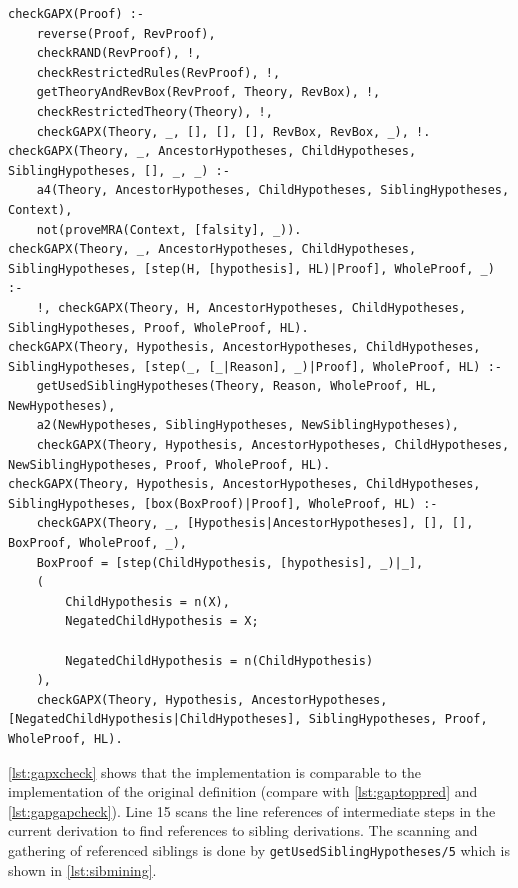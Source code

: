 \documentclass[11pt,twoside,a4paper]{report}
\begin{document}
\begin{lstlisting}[caption={Checking whether a proof is follows the extended Genuine Absurdity Property},label=lst:gapxcheck]
% Checks that the given proof follows the extended GAP property
checkGAPX(Proof) :- 
	reverse(Proof, RevProof), 
	checkRAND(RevProof), !,
	checkRestrictedRules(RevProof), !,
	getTheoryAndRevBox(RevProof, Theory, RevBox), !,
	checkRestrictedTheory(Theory), !,
	checkGAPX(Theory, _, [], [], [], RevBox, RevBox, _), !.
checkGAPX(Theory, _, AncestorHypotheses, ChildHypotheses, SiblingHypotheses, [], _, _) :-
	a4(Theory, AncestorHypotheses, ChildHypotheses, SiblingHypotheses, Context),
	not(proveMRA(Context, [falsity], _)).
checkGAPX(Theory, _, AncestorHypotheses, ChildHypotheses, SiblingHypotheses, [step(H, [hypothesis], HL)|Proof], WholeProof, _) :-
	!, checkGAPX(Theory, H, AncestorHypotheses, ChildHypotheses, SiblingHypotheses, Proof, WholeProof, HL).
checkGAPX(Theory, Hypothesis, AncestorHypotheses, ChildHypotheses, SiblingHypotheses, [step(_, [_|Reason], _)|Proof], WholeProof, HL) :-
	getUsedSiblingHypotheses(Theory, Reason, WholeProof, HL, NewHypotheses),
	a2(NewHypotheses, SiblingHypotheses, NewSiblingHypotheses),
	checkGAPX(Theory, Hypothesis, AncestorHypotheses, ChildHypotheses, NewSiblingHypotheses, Proof, WholeProof, HL).
checkGAPX(Theory, Hypothesis, AncestorHypotheses, ChildHypotheses, SiblingHypotheses, [box(BoxProof)|Proof], WholeProof, HL) :-
	checkGAPX(Theory, _, [Hypothesis|AncestorHypotheses], [], [], BoxProof, WholeProof, _),
	BoxProof = [step(ChildHypothesis, [hypothesis], _)|_],
	(
		ChildHypothesis = n(X),
		NegatedChildHypothesis = X;
		
		NegatedChildHypothesis = n(ChildHypothesis)
	),
	checkGAPX(Theory, Hypothesis, AncestorHypotheses, [NegatedChildHypothesis|ChildHypotheses], SiblingHypotheses, Proof, WholeProof, HL).
\end{lstlisting}

\autoref{lst:gapxcheck} shows that the implementation is comparable to the implementation of the original definition (compare with \autoref{lst:gaptoppred} and \autoref{lst:gapgapcheck}). Line 15 scans the line references of intermediate steps in the current derivation to find references to sibling derivations. The scanning and gathering of referenced siblings is done by \lstinline$getUsedSiblingHypotheses/5$ which is shown in \autoref{lst:sibmining}.
\end{document}
